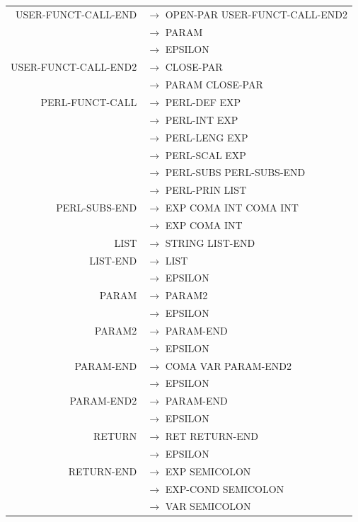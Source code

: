 \documentclass[a4paper,10pt]{article}
\begin{document}
\begin{tabular}{rl}
USER-FUNCT-CALL-END	& $\rightarrow$ OPEN-PAR USER-FUNCT-CALL-END2\\ 
					& $\rightarrow$ PARAM\\ 
					& $\rightarrow$ EPSILON\\
					
USER-FUNCT-CALL-END2& $\rightarrow$ CLOSE-PAR\\ 
					& $\rightarrow$ PARAM CLOSE-PAR\\ 

				
PERL-FUNCT-CALL		& $\rightarrow$ PERL-DEF EXP \\
					& $\rightarrow$ PERL-INT EXP \\
					& $\rightarrow$ PERL-LENG EXP \\ 
					& $\rightarrow$ PERL-SCAL EXP \\
					& $\rightarrow$ PERL-SUBS PERL-SUBS-END \\
					& $\rightarrow$ PERL-PRIN LIST \\ 
					
PERL-SUBS-END		& $\rightarrow$ EXP COMA INT COMA INT \\
					& $\rightarrow$ EXP COMA INT  \\
					
LIST				& $\rightarrow$ STRING LIST-END\\
					
LIST-END			& $\rightarrow$ LIST\\
					& $\rightarrow$ EPSILON\\
				

					
PARAM				& $\rightarrow$ PARAM2\\
					& $\rightarrow$ EPSILON \\

PARAM2				& $\rightarrow$ PARAM-END\\
					& $\rightarrow$ EPSILON \\
					
					
PARAM-END			& $\rightarrow$ COMA VAR PARAM-END2\\ 
					& $\rightarrow$ EPSILON \\
					
PARAM-END2			& $\rightarrow$ PARAM-END\\ 
					& $\rightarrow$ EPSILON \\

RETURN				& $\rightarrow$ RET RETURN-END\\
					& $\rightarrow$ EPSILON \\

RETURN-END			& $\rightarrow$ EXP SEMICOLON\\
					& $\rightarrow$ EXP-COND SEMICOLON\\
					& $\rightarrow$ VAR SEMICOLON\\
					
\end{tabular}
\end{document}
